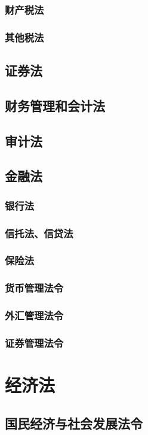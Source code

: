 \documentclass[UTF8]{../ApplicationUniverse}
\begin{document}
        \subsubsection{财产税法}
        \subsubsection{其他税法}

    \subsection{证券法}
    \subsection{财务管理和会计法}
    \subsection{审计法}
    \subsection{金融法}
        \subsubsection{银行法}
        \subsubsection{信托法、信贷法}
        \subsubsection{保险法}
        \subsubsection{货币管理法令}
        \subsubsection{外汇管理法令}
        \subsubsection{证券管理法令}

\section{经济法}
    \subsection{国民经济与社会发展法令}
\end{document}
